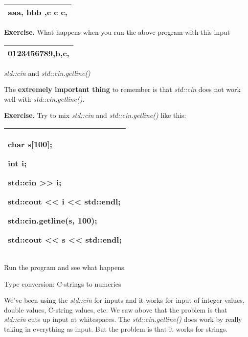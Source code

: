 \documentclass[
]{article}
\begin{document}
\begin{longtable}[]{@{}l@{}}
\toprule
\endhead
aaa, bbb ,c c c,\tabularnewline
\bottomrule
\end{longtable}

\textbf{Exercise.} What happens when you run the above program with this
input

\begin{longtable}[]{@{}l@{}}
\toprule
\endhead
0123456789,b,c,\tabularnewline
\bottomrule
\end{longtable}

\textbf{ }

\emph{std::cin} and \emph{std::cin.getline()}

The \textbf{extremely important thing} to remember is that
\emph{std::cin} does not work well with \emph{std::cin.getline()}.

\textbf{Exercise.} Try to mix \emph{std::cin} and
\emph{std::cin.getline()} like this:

\begin{longtable}[]{@{}l@{}}
\toprule
\endhead
\begin{minipage}[t]{0.97\columnwidth}\raggedright
char s{[}100{]};

int i;

std::cin \textgreater\textgreater{} i;

std::cout \textless\textless{} i \textless\textless{} std::endl;

std::cin.getline(s, 100);

std::cout \textless\textless{} s \textless\textless{} std::endl;\strut
\end{minipage}\tabularnewline
\bottomrule
\end{longtable}

Run the program and see what happens.

Type conversion: C-strings to numerics

We've been using the \emph{std::cin} for inputs and it works for input
of integer values, double values, C-string values, etc. We saw above
that the problem is that \emph{std::cin} cuts up input at whitespaces.
The \emph{std::cin.getline()} does work by really taking in everything
as input. But the problem is that it works for strings.
\end{document}
